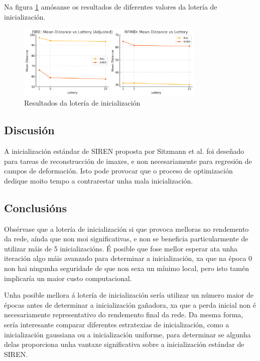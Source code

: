 Na figura \ref{fig:lottery} amósanse os resultados de diferentes valores da lotería de inicialización.


\begin{figure}[tbp]
    \centering
    \includegraphics[width=0.8\textwidth]{imaxes/lottery/lotery.png}
    \caption{Resultados da lotería de inicialización}
    \label{fig:lottery}
\end{figure}


\subsection{Discusión}
\label{subsec:Discusion-initialization}

A inicialización estándar de SIREN proposta por Sitzmann et al. \cite{sitzmann2020implicitneuralrepresentationsperiodic} foi deseñado para tareas de reconstrucción de imaxes, e non necesariamente para regresión de campos de deformación.
Isto pode provocar que o proceso de optimización dedique moito tempo a contrarestar unha mala inicialización. 

\subsection{Conclusións}
\label{subsec:Conclusions-initialization}

Obsérvase que a lotería de inicialización si que provoca melloras no rendemento da rede, aínda que non moi significativas, e non se beneficia particularmente de utilizar máis de 5 inicializacións.
É posible que fose mellor esperar ata unha iteración algo máis avanzado para determinar a inicialización, xa que na época 0 non hai ningunha seguridade de que non sexa un mínimo local, pero isto tamén implicaría un maior custo computacional.

Unha posible mellora á lotería de inicialización sería utilizar un número maior de épocas antes de determinar a inicialización gañadora, xa que a perda inicial non é necesariamente representativo do rendemento final da rede.
Da mesma forma, sería interesante comparar diferentes estratexias de inicialización, como a inicialización gaussiana ou a inicialización uniforme, para determinar se algunha delas proporciona unha vantaxe significativa sobre a inicialización estándar de SIREN.

